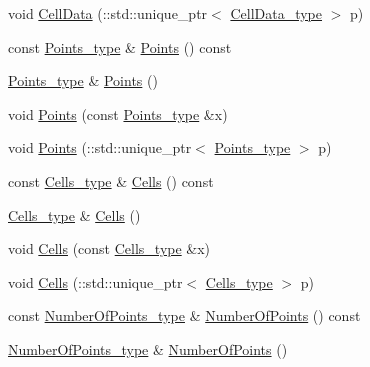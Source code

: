 \begin{DoxyCompactItemize}
\item 
void \hyperlink{classPieceUnstructuredGrid__t_acd0b16101f17e41b9af39f474c2d4d84}{Cell\+Data} (\+::std\+::unique\+\_\+ptr$<$ \hyperlink{classPieceUnstructuredGrid__t_a4232a7b88477ee6f692a4e5fab6a65d1}{Cell\+Data\+\_\+type} $>$ p)
\item 
const \hyperlink{classPieceUnstructuredGrid__t_a7747b159a3d1eee8d02a0eefaa235711}{Points\+\_\+type} \& \hyperlink{classPieceUnstructuredGrid__t_a53dfd670cb335d13003dc229343a0fa1}{Points} () const 
\item 
\hyperlink{classPieceUnstructuredGrid__t_a7747b159a3d1eee8d02a0eefaa235711}{Points\+\_\+type} \& \hyperlink{classPieceUnstructuredGrid__t_aa8e21b391979e8e2e22361e3b29e0276}{Points} ()
\item 
void \hyperlink{classPieceUnstructuredGrid__t_ab653af7be8fbe0d3458bf8cd5cdf3668}{Points} (const \hyperlink{classPieceUnstructuredGrid__t_a7747b159a3d1eee8d02a0eefaa235711}{Points\+\_\+type} \&x)
\item 
void \hyperlink{classPieceUnstructuredGrid__t_afec7f4ca6973137113fbc0932bee8642}{Points} (\+::std\+::unique\+\_\+ptr$<$ \hyperlink{classPieceUnstructuredGrid__t_a7747b159a3d1eee8d02a0eefaa235711}{Points\+\_\+type} $>$ p)
\item 
const \hyperlink{classPieceUnstructuredGrid__t_aca1ec38eff08bde0cd115c54dbb7a20f}{Cells\+\_\+type} \& \hyperlink{classPieceUnstructuredGrid__t_a398de7c2f319c1785810e18f6b43831e}{Cells} () const 
\item 
\hyperlink{classPieceUnstructuredGrid__t_aca1ec38eff08bde0cd115c54dbb7a20f}{Cells\+\_\+type} \& \hyperlink{classPieceUnstructuredGrid__t_a49e65eacff6577cd353fa15a09febf86}{Cells} ()
\item 
void \hyperlink{classPieceUnstructuredGrid__t_a366f0cff854ef350eb1be9da22df6d14}{Cells} (const \hyperlink{classPieceUnstructuredGrid__t_aca1ec38eff08bde0cd115c54dbb7a20f}{Cells\+\_\+type} \&x)
\item 
void \hyperlink{classPieceUnstructuredGrid__t_af45bb840ff71549e6728d774d1e36048}{Cells} (\+::std\+::unique\+\_\+ptr$<$ \hyperlink{classPieceUnstructuredGrid__t_aca1ec38eff08bde0cd115c54dbb7a20f}{Cells\+\_\+type} $>$ p)
\item 
const \hyperlink{classPieceUnstructuredGrid__t_a8df1cd0d138d990e166d325ceed9a660}{Number\+Of\+Points\+\_\+type} \& \hyperlink{classPieceUnstructuredGrid__t_a6fe4a92f59d9a837e046bf3d51e79b33}{Number\+Of\+Points} () const 
\item 
\hyperlink{classPieceUnstructuredGrid__t_a8df1cd0d138d990e166d325ceed9a660}{Number\+Of\+Points\+\_\+type} \& \hyperlink{classPieceUnstructuredGrid__t_adadae535c3c291dc01dd0be3315d9dbc}{Number\+Of\+Points} ()

\end{DoxyCompactItemize}
